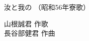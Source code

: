 \documentclass[10pt,b5j]{tarticle} %
\begin{document}
\begin{minipage}[c]{0.7\hsize} %
    \begin{center}
        {\LARGE
            汝と我の %
        }
        {\small 
            （昭和56年寮歌） %
        }
    \end{center}
\end{minipage}
\begin{minipage}[c]{0.3\hsize} %
    \begin{flushright} %
        山根誠君 作歌\\長谷部健君 作曲 %
    \end{flushright}
\end{minipage}
\end{document}
